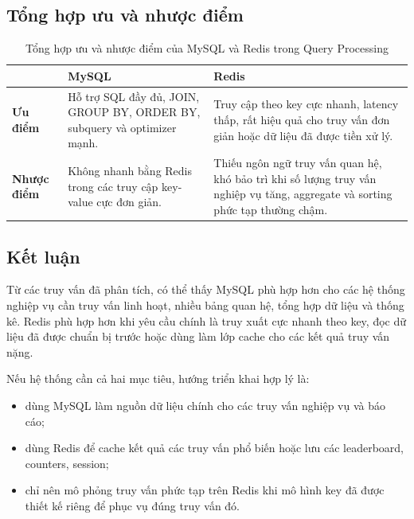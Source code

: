 \subsection{Tổng hợp ưu và nhược điểm}
\begin{table}[H]
\centering
\caption{Tổng hợp ưu và nhược điểm của MySQL và Redis trong Query Processing}
\label{tab:query-summary}
\begin{tabular}{|p{2.5cm}|p{5cm}|p{5cm}|}
\hline
 & \textbf{MySQL} & \textbf{Redis} \\ \hline
\textbf{Ưu điểm} & Hỗ trợ SQL đầy đủ, JOIN, GROUP BY, ORDER BY, subquery và optimizer mạnh. & Truy cập theo key cực nhanh, latency thấp, rất hiệu quả cho truy vấn đơn giản hoặc dữ liệu đã được tiền xử lý. \\ \hline
\textbf{Nhược điểm} & Không nhanh bằng Redis trong các truy cập key-value cực đơn giản. & Thiếu ngôn ngữ truy vấn quan hệ, khó bảo trì khi số lượng truy vấn nghiệp vụ tăng, aggregate và sorting phức tạp thường chậm. \\ \hline
\end{tabular}
\end{table}

\subsection{Kết luận}
Từ các truy vấn đã phân tích, có thể thấy MySQL phù hợp hơn cho các hệ thống nghiệp vụ cần truy vấn linh hoạt, nhiều bảng quan hệ, tổng hợp dữ liệu và thống kê. Redis phù hợp hơn khi yêu cầu chính là truy xuất cực nhanh theo key, đọc dữ liệu đã được chuẩn bị trước hoặc dùng làm lớp cache cho các kết quả truy vấn nặng.

Nếu hệ thống cần cả hai mục tiêu, hướng triển khai hợp lý là:
\begin{itemize}
    \item dùng MySQL làm nguồn dữ liệu chính cho các truy vấn nghiệp vụ và báo cáo;
    \item dùng Redis để cache kết quả các truy vấn phổ biến hoặc lưu các leaderboard, counters, session;
    \item chỉ nên mô phỏng truy vấn phức tạp trên Redis khi mô hình key đã được thiết kế riêng để phục vụ đúng truy vấn đó.
\end{itemize}
